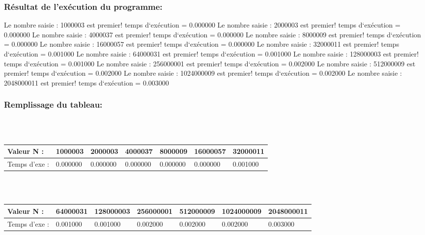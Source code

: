 \documentclass[12pt]{article}
\begin{document}
\subsubsection{Résultat de l'exécution du programme:}
\begin{sql}
Le nombre saisie : 1000003 est premier!
temps d`exécution = 0.000000
Le nombre saisie : 2000003 est premier!
temps d`exécution = 0.000000
Le nombre saisie : 4000037 est premier!
temps d`exécution = 0.000000
Le nombre saisie : 8000009 est premier!
temps d`exécution = 0.000000
Le nombre saisie : 16000057 est premier!
temps d`exécution = 0.000000
Le nombre saisie : 32000011 est premier!
temps d`exécution = 0.001000
Le nombre saisie : 64000031 est premier!
temps d`exécution = 0.001000
Le nombre saisie : 128000003 est premier!
temps d`exécution = 0.001000
Le nombre saisie : 256000001 est premier!
temps d`exécution = 0.002000
Le nombre saisie : 512000009 est premier!
temps d`exécution = 0.002000
Le nombre saisie : 1024000009 est premier!
temps d`exécution = 0.002000
Le nombre saisie : 2048000011 est premier!
temps d`exécution = 0.003000
\end{sql}


\subsubsection{Remplissage du tableau:}
\color{blue}
\textrm{  }
\\
\\
\begin{tabular}{|p{3cm}||p{1.8cm}|p{1.8cm}|p{1.8cm}|p{1.8cm}|p{1.8cm}|p{1.8cm}|}
\hline
Valeur N : & 1000003 & 2000003 & 4000037 & 8000009 & 16000057  & 32000011\\
\hline
Temps d'exe : & 0.000000 & 0.000000 & 0.000000 & 0.000000 & 0.000000 & 0.001000 \\
\hline
\end{tabular}
\\
\\
\begin{tabular}{|p{3cm}||p{1.8cm}|p{1.8cm}|p{1.8cm}|p{1.8cm}|p{1.8cm}|p{1.8cm}|}
\hline
Valeur N : & 64000031 & 128000003 & 256000001 & 512000009 &  1024000009 & 2048000011\\
\hline
Temps d'exe : &  0.001000 & 0.001000 & 0.002000 & 0.002000 & 0.002000 & 0.003000 \\
\hline
\end{tabular}


\textrm{  }
\\
\color{black}
\end{document}
